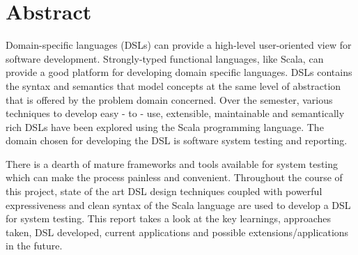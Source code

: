 \section{Abstract}
Domain-specific languages (DSLs) can provide a high-level user-oriented view for software development. Strongly-typed functional languages, like Scala, can provide a good platform for developing domain specific languages. DSLs contains the syntax and semantics that model concepts at the same level of abstraction that is offered by the problem domain concerned. Over the semester, various techniques to develop easy - to - use, extensible, maintainable and semantically rich DSLs have been explored using the Scala programming language. The domain chosen for developing the DSL is software system testing and reporting.
\bigskip

\noindent
There is a dearth of mature frameworks and tools available for system testing which can make the process painless and convenient. Throughout the course of this project, state of the art DSL design techniques coupled with powerful expressiveness and clean syntax of the Scala language are used to develop a DSL for system testing. This report takes a look at the key learnings, approaches taken, DSL developed, current applications and possible extensions/applications in the future.
\newpage